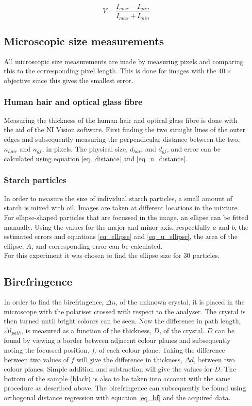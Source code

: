 \begin{equation}
  V = \frac{I_{max}-I_{min}}{I_{max}+I_{min}}
  \label{eq:visibility}
\end{equation}
\subsection{Microscopic size measurements}
All microscopic size measurements are made by measuring pixels and comparing this to the corresponding pixel length. This is done for images with the $40\times$ objective since this gives the smallest error.

\subsubsection*{Human hair and optical glass fibre}
Measuring the thickness of the human hair and optical glass fibre is done with the aid of the NI Vision software. First finding the two straight lines of the outer edges and subsequently measuring the perpendicular distance between the two, $n_{hair}$ and $n_{gf}$, in pixels. The physical size, $d_{hair}$ and $d_{gf}$, and error can be calculated using equation \ref{eq_distance} and \ref{eq_u_distance}.


\subsubsection*{Starch particles}
In order to measure the size of individual starch particles, a small amount of starch is mixed with oil. Images are taken at different locations in the mixture. For ellipse-shaped particles that are focussed in the image, an ellipse can be fitted manually. Using the values for the major and minor axis, respectfully $a$ and $b$, the estimated errors and equations \ref{eq_ellipse} and \ref{eq_u_ellipse}, the area of the ellipse, $A$, and corresponding error can be calculated.\\

For this experiment it was chosen to find the ellipse size for 30 particles.


\subsection{Birefringence}
In order to find the birefringence, $\Delta n$, of the unknown crystal, it is placed in the microscope with the polariser crossed with respect to the analyser. The crystal is then turned until bright colours can be seen. Now the difference in path length, $\Delta l_{path}$, is measured as a function of the thickness, $D$, of the crystal. $D$ can be found by viewing a border between adjacent colour planes and subsequently noting the focussed position, $f$, of each colour plane. Taking the difference between two values of $f$ will give the difference in thickness, $\Delta d$, between two colour planes. Simple addition and subtraction will give the values for $D$. The bottom of the sample (black) is also to be taken into account with the same procedure as described above. The birefringence can subsequently be found using orthogonal distance regression with equation \ref{eq_bf} and the acquired data.\\

